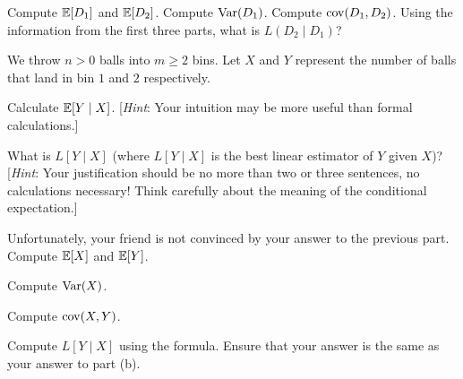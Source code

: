 \documentclass[11pt]{article}
\begin{document}
\begin{Parts}
	\Part Compute $\operatorname{\mathbb{E}}[D_1]$ and $\operatorname{\mathbb{E}}[D_2]$.
	\Part Compute $\operatorname{Var}(D_1)$. 
	\Part Compute $\operatorname{cov}(D_1, D_2)$.
    \Part Using the information from the first three parts, what is $L(D_2 \mid D_1)$?
\end{Parts}

We throw $n > 0$ balls into $m \geq 2$ bins. Let $X$ and $Y$ represent the number of balls that land in bin $1$ and $2$ respectively.

\begin{Parts}

    \Part Calculate $\operatorname{\mathbb{E}}[Y \mid X]$. [\textit{Hint}: Your intuition may be more useful than formal calculations.]

    \Part What is $L[Y \mid X]$ (where $L[Y \mid X]$ is the best linear estimator of $Y$ given $X$)? [\textit{Hint}: Your justification should be no more than two or three sentences, no calculations necessary! Think carefully about the meaning of the conditional expectation.]

  \Part Unfortunately, your friend is not convinced by your answer to the previous part. Compute $\operatorname{\mathbb{E}}[X]$ and $\operatorname{\mathbb{E}}[Y]$.

  \Part Compute $\operatorname{Var}(X)$.

  \Part Compute $\operatorname{cov}(X, Y)$.

  \Part Compute $L[Y \mid X]$ using the formula. Ensure that your answer is the same as your answer to part (b).

\end{Parts}
\end{document}
